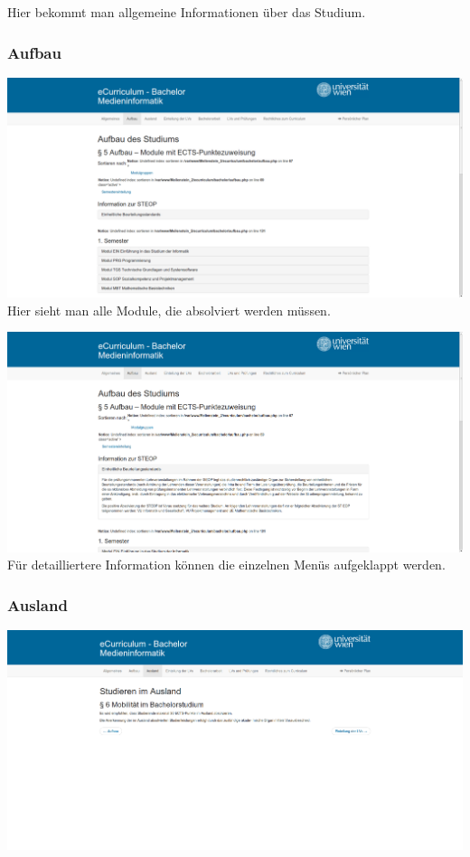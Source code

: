 \documentclass[a4paper,10pt]{scrartcl}
\begin{document}
Hier bekommt man allgemeine Informationen über das Studium.

\subsubsection{Aufbau}

\includegraphics[scale=0.19]{./hifi_screenshots/hifi_aufbau1.png}\\

Hier sieht man alle Module, die absolviert werden müssen.

\includegraphics[scale=0.19]{./hifi_screenshots/hifi_aufbau2.png}\\

Für detailliertere Information können die einzelnen Menüs aufgeklappt werden.

\subsubsection{Ausland}

\includegraphics[scale=0.19]{./hifi_screenshots/hifi_ausland.png}\\
\end{document}
